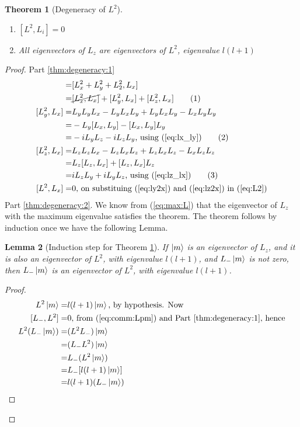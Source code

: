 \documentclass[]{article}
\newcommand\numberthis{\addtocounter{equation}{1}\tag{\theequation}}
\newtheorem{thm}{Theorem}
\newtheorem{lemma}[thm]{Lemma}
\begin{document}
\begin{thm}[Degeneracy of $L^2$]\label{thm:degeneracy:L2}
	\begin{enumerate}
		\item $[L^2, L_i] =0$\label{thm:degeneracy:1}
		\item All eigenvectors of $L_z$ are eigenvectors of $L^2$, eigenvalue $l(l+1)$\label{thm:degeneracy:2}
	\end{enumerate}
\end{thm}
\begin{proof}
	Part \ref{thm:degeneracy:1}
	\begin{align*}
		[L^2, L_x] =& [L_x^2+L_y^2+L_2^2,L_x]\\
		=& \cancel{[L_x^2,L_x]} + [L_y^2,L_x] + [L_z^2,L_x] \numberthis \label{eq:L2}\\
		[L_y^2,L_x]=&L_yL_yL_x -L_y L_x L_y + L_y L_x L_y -L_xL_yL_y\\
		=&-L_y[L_x,L_y]-[L_x,L_y]L_y\\
		=&-iL_yL_z-iL_zL_y \text{, using (\ref{eq:lx_ly})} \numberthis \label{eq:ly2x}\\
		[L_z^2,L_x]=&L_zL_zL_x -L_z L_x L_z + L_z L_x L_z -L_xL_zL_z\\
		=&L_z[L_z,L_x]+[L_z,L_x]L_z\\
		=&iL_zL_y+iL_yL_z \text{, using (\ref{eq:lz_lx})} \numberthis \label{eq:lz2x}\\
		[L^2, L_x] =&0 \text{, on substituing (\ref{eq:ly2x}) and (\ref{eq:lz2x}) in (\ref{eq:L2})}
	\end{align*}
	Part \ref{thm:degeneracy:2}. We know from (\ref{eq:max:L}) that the eigenvector of $L_z$ with the maximum eigenvalue satisfies the  theorem. The theorem follows by induction once we have the following Lemma.
	\begin{lemma}[Induction step for Theorem \ref{thm:degeneracy:L2}]
		If $\ket{m}$ is an eigenvector of $L_z$, and it is also an eigenvector of $L^2$, with eigenvalue $l(l+1)$, and $L_-\ket{m}$ is not zero, then  $L_-\ket{m}$ is an eigenvector of $L^2$, with eigenvalue $l(l+1)$.
	\end{lemma}
	\begin{proof}
		\begin{align*}
		L^2\ket{m}=&l (l+1) \ket{m} \text{, by hypothesis. Now}\\
		[L_-,L^2] =& 0 \text{, from (\ref{eq:comm:Lpm}) and Part \ref{thm:degeneracy:1}, hence}\\
		L^2(L_- \ket{m})=&(L^2 L_-) \ket{m}\\
		=& (L_- L^2) \ket{m}\\
		=& L_- (L^2 \ket{m})\\
		=& L_- [l (l+1) \ket{m}]\\
		=& l (l+1) (L_- \ket{m})
		\end{align*}
	\end{proof}
	
\end{proof}
\end{document}
